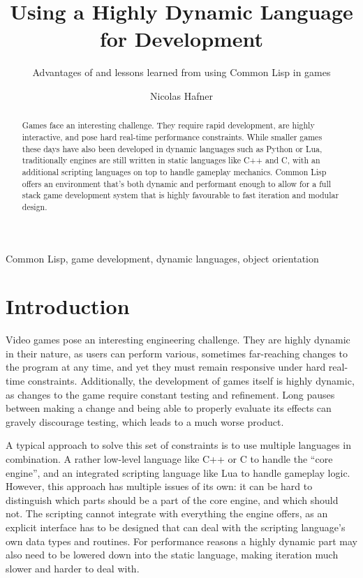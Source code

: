 \documentclass[a4paper]{paper}
\title{Using a Highly Dynamic Language for Development}
\subtitle{Advantages of and lessons learned from using Common Lisp in games}
\author{Nicolas Hafner}
\begin{document}
\twocolumn[\maketitle]

\begin{abstract}
  Games face an interesting challenge. They require rapid development, are highly interactive, and pose hard real-time performance constraints. While smaller games these days have also been developed in dynamic languages such as Python or Lua, traditionally engines are still written in static languages like C++ and C, with an additional scripting languages on top to handle gameplay mechanics. Common Lisp offers an environment that's both dynamic and performant enough to allow for a full stack game development system that is highly favourable to fast iteration and modular design.
\end{abstract}
\begin{keywords}
  Common Lisp, game development, dynamic languages, object orientation
\end{keywords}

\def\abovecaptionskip{1pt}
\def\listingautorefname{Listing}
\def\figureautorefname{Figure}

\section{Introduction}
Video games pose an interesting engineering challenge. They are highly dynamic in their nature, as users can perform various, sometimes far-reaching changes to the program at any time, and yet they must remain responsive under hard real-time constraints. Additionally, the development of games itself is highly dynamic, as changes to the game require constant testing and refinement. Long pauses between making a change and being able to properly evaluate its effects can gravely discourage testing, which leads to a much worse product.

A typical approach to solve this set of constraints is to use multiple languages in combination. A rather low-level language like C++ or C to handle the ``core engine'', and an integrated scripting language like Lua to handle gameplay logic. However, this approach has multiple issues of its own: it can be hard to distinguish which parts should be a part of the core engine, and which should not. The scripting cannot integrate with everything the engine offers, as an explicit interface has to be designed that can deal with the scripting language's own data types and routines. For performance reasons a highly dynamic part may also need to be lowered down into the static language, making iteration much slower and harder to deal with.
\end{document}
